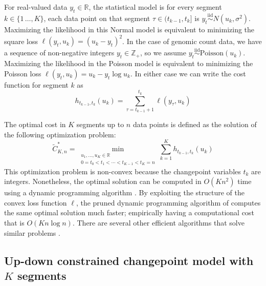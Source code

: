 \documentclass[twoside,11pt]{article}
\newcommand{\ZZ}{\mathbb Z}
\newcommand{\RR}{\mathbb R}
\begin{document}
For real-valued data $y_t\in\RR$, the statistical model is for every
segment $k\in\{1\,\dots,K\}$, each data point on that segment
$\tau\in(t_{k-1},t_k]$ is
$y_t\stackrel{\text{iid}}{\sim}N(u_k,\sigma^2)$.  Maximizing the
likelihood in this Normal model is equivalent to minimizing the square
loss $\ell(y_t,u_k)=(u_k-y_t)^2$. In the case of genomic count data,
we have a sequence of non-negative integers $y_t\in\ZZ_+$, so we
assume $y_t\stackrel{\text{iid}}{\sim}\text{Poisson}(u_k)$.
Maximizing the likelihood in the Poisson model is equivalent to
minimizing the Poisson loss $\ell(y_t,u_k)=u_k-y_t\log u_k$. In either
case we can write the cost function for segment $k$ as
\begin{equation}
  \label{eq:h}
  h_{t_{k-1}, t_k}(u_k) = \sum_{\tau=t_{k-1}+1}^{t_k} \ell(y_\tau, u_k)
\end{equation}

The optimal cost in $K$ segments up to $n$ data points
is defined as the solution of the following optimization problem:
\begin{equation}
  \label{eq:segment-neighborhood}
\tilde{C}^*_{K,n} = \min_{\substack{
u_1,\dots, u_{K}\in\RR
\\
0=t_0<t_1<\cdots<t_{K-1}<t_K=n
}}
  \sum_{k=1}^K
h_{t_{k-1}, t_k}(u_k)
\end{equation}
This optimization problem is non-convex because the changepoint
variables $t_k$ are integers. Nonetheless, the optimal solution can be
computed in $O(K n^2)$ time using a dynamic programming algorithm
\citep{segment-neighborhood}. By exploiting the structure of the
convex loss function $\ell$, the pruned dynamic programming algorithm
of \citet{pruned-dp} computes the same optimal solution much faster;
empirically having a computational cost that is $O(K n \log n)$.
There are several other efficient algorithms that solve similar
problems \citep{optimal-partitioning,flsa,phd-johnson,pelt,fpop}.


\subsection{Up-down constrained changepoint model with $K$ segments}
\end{document}
